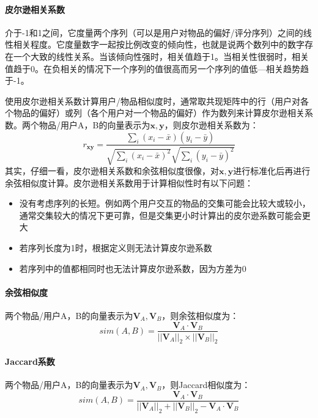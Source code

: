 \paragraph{皮尔逊相关系数}
介于-1和1之间，它度量两个序列（可以是用户对物品的偏好/评分序列）之间的线性相关程度。它度量数字一起按比例改变的倾向性，也就是说两个数列中的数字存在一个大致的线性关系。当该倾向性强时，相关值趋于1。当相关性很弱时，相关值趋于0。在负相关的情况下一个序列的值很高而另一个序列的值低---相关趋势趋于-1。

使用皮尔逊相关系数计算用户/物品相似度时，通常取共现矩阵中的行（用户对各个物品的偏好）或列（各个用户对一个物品的偏好）作为数列来计算皮尔逊相关系数。两个物品/用户A，B的向量表示为$\boldsymbol{x}, \boldsymbol{y}$，则皮尔逊相关系数为：
$$
r_{\boldsymbol{xy}} = \frac{\sum_i (x_i - \bar{x})(y_i - \bar{y})}{\sqrt{\sum_i (x_i - \bar{x})^2} \sqrt{\sum_i (y_i - \bar{y})^2}}
$$
其实，仔细一看，皮尔逊相关系数和余弦相似度很像，对$\boldsymbol{x}, \boldsymbol{y}$进行标准化后再进行余弦相似度计算。皮尔逊相关系数用于计算相似性时有以下问题：
\begin{itemize}
	\item 没有考虑序列的长短。例如两个用户交互的物品的交集可能会比较大或较小，通常交集较大的情况下更可靠，但是交集更小时计算出的皮尔逊系数可能会更大
	\item 若序列长度为1时，根据定义则无法计算皮尔逊系数
	\item 若序列中的值都相同时也无法计算皮尔逊系数，因为方差为0
\end{itemize}


\paragraph{余弦相似度}
两个物品/用户A，B的向量表示为$\boldsymbol{V}_A, \boldsymbol{V}_B$，则余弦相似度为：
$$
sim(A, B) = \frac{\boldsymbol{V}_A \cdot \boldsymbol{V}_B}{||\boldsymbol{V}_A||_2 \times ||\boldsymbol{V}_B||_2}
$$

\paragraph{Jaccard系数}
两个物品/用户A，B的向量表示为$\boldsymbol{V}_A, \boldsymbol{V}_B$，则Jaccard相似度为：
$$
sim(A, B) = \frac{\boldsymbol{V}_A \cdot \boldsymbol{V}_B}{||\boldsymbol{V}_A||_2 + ||\boldsymbol{V}_B||_2 - \boldsymbol{V}_A \cdot \boldsymbol{V}_B}
$$


